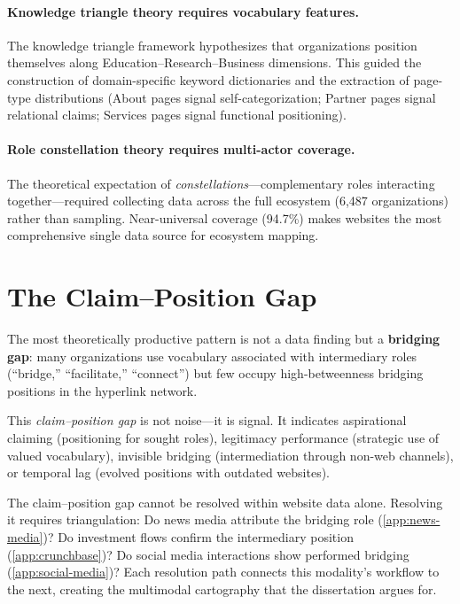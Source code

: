 \documentclass[../main.tex]{subfiles}
\begin{document}
\paragraph{Knowledge triangle theory requires vocabulary features.}
The knowledge triangle framework hypothesizes that organizations position
themselves along Education--Research--Business dimensions.
This guided the construction of domain-specific keyword dictionaries
and the extraction of page-type distributions
(About pages signal self-categorization; Partner pages signal relational claims;
Services pages signal functional positioning).

\paragraph{Role constellation theory requires multi-actor coverage.}
The theoretical expectation of \emph{constellations}---complementary roles
interacting together---required collecting data across the full
ecosystem (6,487 organizations) rather than sampling.
Near-universal coverage (94.7\%) makes websites the most
comprehensive single data source for ecosystem mapping.


\section{The Claim--Position Gap}
\label{sec:websites-gap}

The most theoretically productive pattern is not a data finding
but a \textbf{bridging gap}: many organizations use vocabulary
associated with intermediary roles
(``bridge,'' ``facilitate,'' ``connect'')
but few occupy high-betweenness bridging positions in the hyperlink network.

This \emph{claim--position gap} is not noise---it is signal.
It indicates aspirational claiming (positioning for sought roles),
legitimacy performance (strategic use of valued vocabulary),
invisible bridging (intermediation through non-web channels),
or temporal lag (evolved positions with outdated websites).

\begin{criticalbox}
The claim--position gap cannot be resolved within website data alone.
Resolving it requires triangulation:
Do news media attribute the bridging role (\cref{app:news-media})?
Do investment flows confirm the intermediary position (\cref{app:crunchbase})?
Do social media interactions show performed bridging (\cref{app:social-media})?
Each resolution path connects this modality's workflow to the next,
creating the multimodal cartography that the dissertation argues for.
\end{criticalbox}
\end{document}
